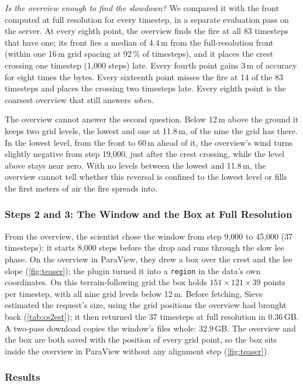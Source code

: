 \documentclass{vgtc}
\newcommand{\sname}{Sieve}
\newcommand{\code}[1]{\texttt{#1}}
\begin{document}
\emph{Is the overview enough to find the slowdown?} We compared it with the front computed
at full resolution for every timestep, in a separate evaluation pass on the server. At
every eighth point, the overview finds the fire at all 83 timesteps that have one; its
front lies a median of 4.4\,m from the full-resolution front (within one 16\,m grid spacing
at 92\,\% of timesteps), and it places the crest crossing one timestep (1{,}000 steps)
late. Every fourth point
gains 3\,m of accuracy for eight times the bytes. Every sixteenth point misses the fire at
14 of the 83 timesteps and places the crossing two timesteps late. Every eighth point is
the coarsest overview that still answers \emph{when}.

The overview cannot answer the second question. Below 12\,m above the ground it keeps two
grid levels, the lowest and one at 11.8\,m, of the nine the grid has there. In the lowest
level, from the front to 60\,m ahead of it, the overview's wind turns slightly negative
from step 19{,}000, just after the crest crossing, while the level above stays near zero.
With no levels between the lowest and 11.8\,m, the overview cannot tell whether this
reversal is confined to the lowest level or fills the first meters of air the fire
spreads into.

\subsubsection{Steps 2 and 3: The Window and the Box at Full Resolution}

From the overview, the scientist chose the window from step 9{,}000 to 45{,}000
(37 timesteps): it starts 8{,}000 steps before the drop and runs through the slow lee
phase. On the overview in ParaView, they drew a box over the crest and the lee slope
(\cref{fig:teaser}); the plugin turned it into a \code{region} in the data's own
coordinates. On this terrain-following grid the box holds $151 \times 121 \times 39$
points per timestep, with all nine grid levels below 12\,m. Before fetching, \sname{} estimated
the request's size, using the grid positions the overview had brought back
(\cref{tab:cs2est}); it then returned the 37 timesteps at full resolution in 0.36\,GB. A two-pass download copies the window's files whole: 32.9\,GB.
The overview and the box are both saved with the position of every grid point, so the box sits
inside the overview in ParaView without any alignment step (\cref{fig:teaser}).

\subsubsection{Results}
\end{document}
